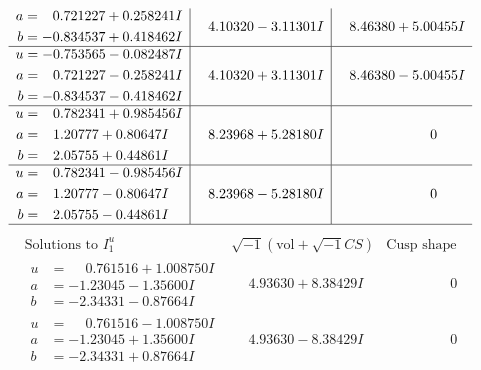 \documentclass[1p]{elsarticle_modified}
\theoremstyle{definition}
\newcommand{\I}{\sqrt{-1}}
\begin{document}
$$\begin{array}{c|c|c}
\begin{aligned}
a &= \phantom{-}0.721227 + 0.258241 I \\
b &= -0.834537 + 0.418462 I\end{aligned}
 & \phantom{-}4.10320 - 3.11301 I & \phantom{-}8.46380 + 5.00455 I \\ \hline\begin{aligned}
u &= -0.753565 - 0.082487 I \\
a &= \phantom{-}0.721227 - 0.258241 I \\
b &= -0.834537 - 0.418462 I\end{aligned}
 & \phantom{-}4.10320 + 3.11301 I & \phantom{-}8.46380 - 5.00455 I \\ \hline\begin{aligned}
u &= \phantom{-}0.782341 + 0.985456 I \\
a &= \phantom{-}1.20777 + 0.80647 I \\
b &= \phantom{-}2.05755 + 0.44861 I\end{aligned}
 & \phantom{-}8.23968 + 5.28180 I & \phantom{-0.000000 } 0 \\ \hline\begin{aligned}
u &= \phantom{-}0.782341 - 0.985456 I \\
a &= \phantom{-}1.20777 - 0.80647 I \\
b &= \phantom{-}2.05755 - 0.44861 I\end{aligned}
 & \phantom{-}8.23968 - 5.28180 I & \phantom{-0.000000 } 0\\
 \hline 
 \end{array}$$\newpage$$\begin{array}{c|c|c}  
\text{Solutions to }I^u_{1}& \I (\text{vol} + \sqrt{-1}CS) & \text{Cusp shape}\\
 \hline 
\begin{aligned}
u &= \phantom{-}0.761516 + 1.008750 I \\
a &= -1.23045 - 1.35600 I \\
b &= -2.34331 - 0.87664 I\end{aligned}
 & \phantom{-}4.93630 + 8.38429 I & \phantom{-0.000000 } 0 \\ \hline\begin{aligned}
u &= \phantom{-}0.761516 - 1.008750 I \\
a &= -1.23045 + 1.35600 I \\
b &= -2.34331 + 0.87664 I\end{aligned}
 & \phantom{-}4.93630 - 8.38429 I & \phantom{-0.000000 } 0 \\ \hline\begin{aligned}

\end{aligned}
\end{array}$$
\end{document}

